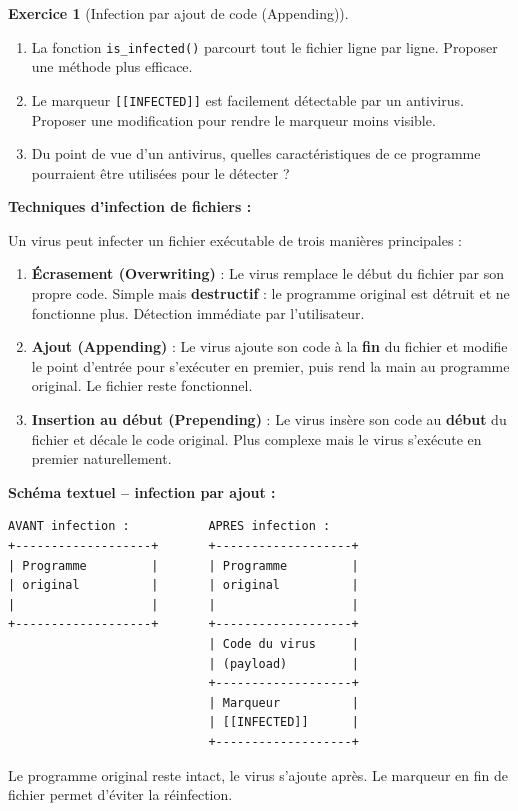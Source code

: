 \documentclass[a4paper,11pt]{article}
\theoremstyle{plain}
\theoremstyle{definition}
\newtheorem{exercice}{Exercice}
\begin{document}
\begin{exercice}[Infection par ajout de code (Appending)]
\begin{enumerate}
\item La fonction \texttt{is\_infected()} parcourt tout le fichier ligne par ligne. Proposer une méthode plus efficace.

\item Le marqueur \texttt{[[INFECTED]]} est facilement détectable par un antivirus. Proposer une modification pour rendre le marqueur moins visible.

\item Du point de vue d'un antivirus, quelles caractéristiques de ce programme pourraient être utilisées pour le détecter ?
\end{enumerate}

\end{exercice}

\begin{rappel}
\textbf{Techniques d'infection de fichiers :}

Un virus peut infecter un fichier exécutable de trois manières principales :

\begin{enumerate}
    \item \textbf{Écrasement (Overwriting)} : Le virus remplace le début du fichier par son propre code. Simple mais \textbf{destructif} : le programme original est détruit et ne fonctionne plus. Détection immédiate par l'utilisateur.

    \item \textbf{Ajout (Appending)} : Le virus ajoute son code à la \textbf{fin} du fichier et modifie le point d'entrée pour s'exécuter en premier, puis rend la main au programme original. Le fichier reste fonctionnel.

    \item \textbf{Insertion au début (Prepending)} : Le virus insère son code au \textbf{début} du fichier et décale le code original. Plus complexe mais le virus s'exécute en premier naturellement.
\end{enumerate}

\medskip
\textbf{Schéma textuel -- infection par ajout :}

\begin{lstlisting}[numbers=none,frame=none,backgroundcolor=\color{white}]
AVANT infection :           APRES infection :
+-------------------+       +-------------------+
| Programme         |       | Programme         |
| original          |       | original          |
|                   |       |                   |
+-------------------+       +-------------------+
                            | Code du virus     |
                            | (payload)         |
                            +-------------------+
                            | Marqueur          |
                            | [[INFECTED]]      |
                            +-------------------+
\end{lstlisting}

Le programme original reste intact, le virus s'ajoute après. Le marqueur en fin de fichier permet d'éviter la réinfection.
\end{rappel}
\end{document}
